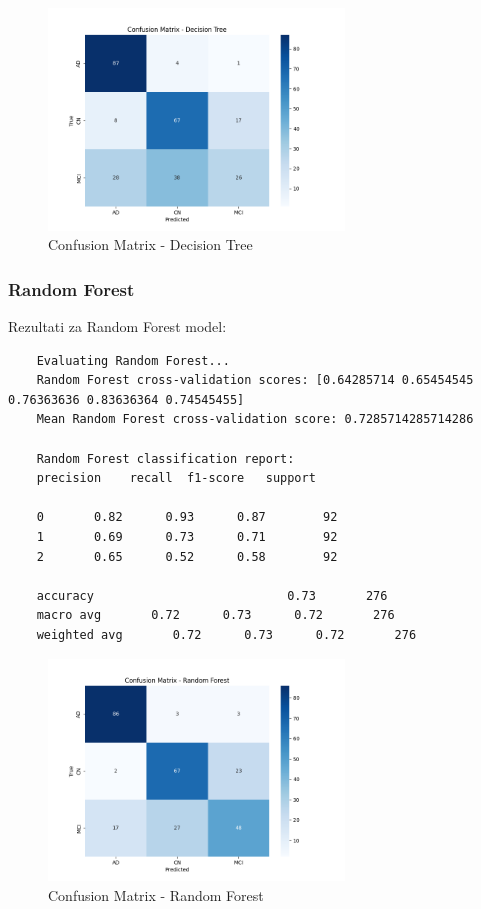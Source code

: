 \documentclass[zavrsnirad]{fer}
\begin{document}
\begin{figure}[h]
	\centering
	\includegraphics[width=0.7\textwidth]{Figures/matrix_dt.png}
	\caption{Confusion Matrix - Decision Tree}
	\label{fig:matrix_dt}
\end{figure}

\subsubsection{Random Forest}

Rezultati za Random Forest model:

\begin{verbatim}
	Evaluating Random Forest...
	Random Forest cross-validation scores: [0.64285714 0.65454545 0.76363636 0.83636364 0.74545455]
	Mean Random Forest cross-validation score: 0.7285714285714286
	
	Random Forest classification report:
	precision    recall  f1-score   support
	
	0       0.82      0.93      0.87        92
	1       0.69      0.73      0.71        92
	2       0.65      0.52      0.58        92
	
	accuracy                           0.73       276
	macro avg       0.72      0.73      0.72       276
	weighted avg       0.72      0.73      0.72       276

\end{verbatim}

\begin{figure}[h]
	\centering
	\includegraphics[width=0.7\textwidth]{Figures/matrix_rf.png}
	\caption{Confusion Matrix - Random Forest}
	\label{fig:matrix_rf}
\end{figure}
\end{document}
